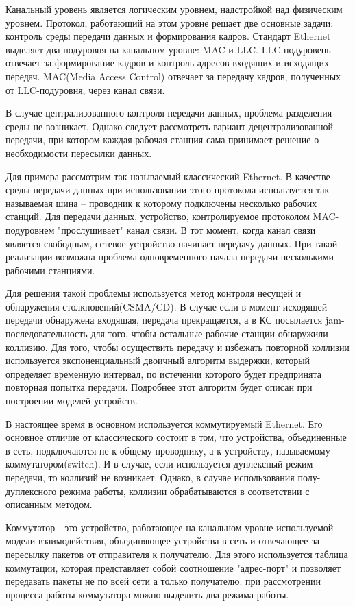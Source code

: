 \documentclass[12pt]{report}
\begin{document}
    Канальный уровень является логическим уровнем, надстройкой над физическим уровнем. Протокол, работающий на этом уровне решает две основные задачи: контроль среды передачи данных и формирования кадров. Стандарт Ethernet выделяет два подуровня на канальном уровне: MAC и LLC. LLC-подуровень отвечает за формирование кадров и контроль адресов входящих и исходящих передач. MAC(Media Access Control) отвечает за передачу кадров, полученных от LLC-подуровня, через канал связи.

    В случае централизованного контроля передачи данных, проблема разделения среды не возникает. Однако следует рассмотреть вариант децентрализованной передачи, при котором каждая рабочая станция сама принимает решение о необходимости пересылки данных.

    Для примера рассмотрим так называемый классический Ethernet. В качестве среды передачи данных при использовании этого протокола используется так называемая шина -- проводник к которому подключены несколько рабочих станций. Для передачи данных, устройство, контролируемое протоколом MAC-подуровнем "прослушивает" канал связи. В тот момент, когда канал связи является свободным, сетевое устройство начинает передачу данных. При такой реализации возможна проблема одновременного начала передачи несколькими рабочими станциями.

    Для решения такой проблемы используется метод контроля несущей и обнаружения столкновений(CSMA/CD). В случае если в момент исходящей передачи обнаружена входящая, передача прекращается, а в КС посылается jam-последовательность для того, чтобы остальные рабочие станции обнаружили коллизию. Для того, чтобы осуществить передачу и избежать повторной коллизии используется экспоненциальный двоичный алгоритм выдержки, который определяет временную интервал, по истечении которого будет предпринята повторная попытка передачи. Подробнее этот алгоритм будет описан при построении моделей устройств.

    В настоящее время в основном используется коммутируемый Ethernet. Его основное отличие от классического состоит в том, что устройства, объединенные в сеть, подключаются не к общему проводнику, а к устройству, называемому коммутатором(switch). И в случае, если используется дуплексный режим передачи, то коллизий не возникает. Однако, в случае использования полу-дуплексного режима работы, коллизии обрабатываются в соответствии с описанным методом.

    Коммутатор - это устройство, работающее на канальном уровне используемой модели взаимодействия, объединяющее устройства в сеть и отвечающее за пересылку пакетов от отправителя к получателю. Для этого используется таблица коммутации, которая представляет собой соотношение "адрес-порт" и позволяет передавать пакеты не по всей сети а только получателю. при рассмотрении процесса работы коммутатора можно выделить два режима работы.
\end{document}
